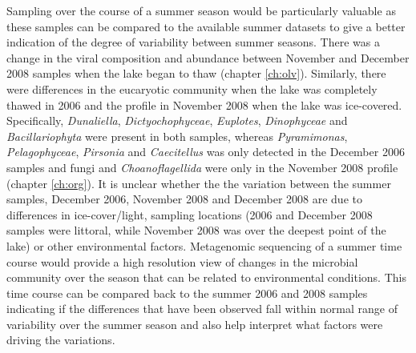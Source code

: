 Sampling over the course of a summer season would be particularly valuable as these samples can be compared to the available summer datasets to give a better indication of the degree of variability between summer seasons.
There was a change in the viral composition and abundance between November and December 2008 samples when the lake began to thaw (chapter \ref{ch:olv}).
Similarly, there were differences in the eucaryotic community when the lake was completely thawed in 2006 and the profile in November 2008 when the lake was ice-covered.
Specifically, \emph{Dunaliella}, \emph{Dictyochophyceae}, \emph{Euplotes}, \emph{Dinophyceae} and \emph{Bacillariophyta} were present in both samples, whereas \emph{Pyramimonas}, \emph{Pelagophyceae}, \emph{Pirsonia} and \emph{Caecitellus} was only detected in the December 2006 samples and fungi and \emph{Choanoflagellida} were only in the November 2008 profile (chapter \ref{ch:org}).
It is unclear whether the the variation between the summer samples, December 2006, November 2008 and December 2008 are due to differences in ice-cover/light, sampling locations  (2006 and December 2008 samples were littoral, while November 2008 was over the deepest point of the lake) or other environmental factors.
Metagenomic sequencing of a summer time course would provide a high resolution view of changes in the microbial community over the season that can be related to environmental conditions.
This time course can be compared back to the summer 2006 and 2008 samples indicating if the differences that have been observed fall within normal range of variability over the summer season and also help interpret what factors were driving the variations.

